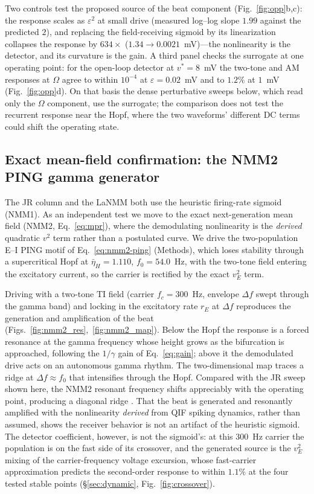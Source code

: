 \documentclass[11pt,a4paper]{article}
\begin{document}
Two controls test the proposed source of the beat component (Fig.~\ref{fig:opp}b,c): the response scales as
$\varepsilon^2$ at small drive (measured log--log slope $1.99$ against the
predicted $2$), and replacing the field-receiving sigmoid by its linearization
collapses the response by $634\times$ ($1.34\!\to\!0.0021$~mV)---the nonlinearity is
the detector, and its curvature is the gain. A third panel checks the surrogate at one operating point: for the open-loop detector
at $v^*=8$~mV the two-tone and AM responses at $\Omega$ agree to within $10^{-4}$ at
$\varepsilon=0.02$~mV and to $1.2\%$ at $1$~mV (Fig.~\ref{fig:opp}d). On that basis the
dense perturbative sweeps below, which read only the $\Omega$ component, use the surrogate;
the comparison does not test the recurrent response near the Hopf, where the two
waveforms' different DC terms could shift the operating state.

\subsection{Exact mean-field confirmation: the NMM2 PING gamma generator}\label{sec:nmm2-results}
The JR column and the LaNMM both use the heuristic firing-rate sigmoid (NMM1). As an
independent test we move to the exact next-generation mean field (NMM2,
Eq.~\eqref{eq:mpr}), where the demodulating nonlinearity is the \emph{derived}
quadratic $v^2$ term rather than a postulated curve. We drive the two-population E--I PING motif of
Eq.~\eqref{eq:nmm2-ping} (Methods), which loses stability through a supercritical
Hopf at $\bar\eta_H=1.110$, $f_0=54.0$~Hz, with the two-tone field entering the
excitatory current,
so the carrier is rectified by the exact $v_E^2$ term.

Driving with a two-tone TI field (carrier $f_c=300$~Hz, envelope $\Delta f$ swept through
the gamma band) and locking in the excitatory rate $r_E$ at $\Delta f$ reproduces the
generation and amplification of the beat (Figs.~\ref{fig:nmm2_res},~\ref{fig:nmm2_map}). Below the Hopf the
response is a forced resonance at the gamma frequency whose height grows as the
bifurcation is approached, following the $1/\gamma$ gain of Eq.~\eqref{eq:gain}; above it the
demodulated drive acts on an autonomous gamma rhythm. The two-dimensional map traces a
ridge at $\Delta f\!\approx\!f_0$ that intensifies through the Hopf. Compared with the
JR sweep shown here, the NMM2 resonant frequency shifts appreciably with the
operating point, producing a diagonal ridge \cite{clusella2023}. That the beat is generated and resonantly amplified with the nonlinearity
\emph{derived} from QIF spiking dynamics, rather than assumed, shows the receiver behavior
is not an artifact of the heuristic sigmoid. The detector coefficient, however, is not the
sigmoid's: at this $300$~Hz carrier the population is on the fast side of its crossover,
and the generated source is the $v_E^2$ mixing of the carrier-frequency voltage excursion,
whose fast-carrier approximation predicts the second-order response to within
$1.1\%$ at the four tested stable points (\S\ref{sec:dynamic}, Fig.~\ref{fig:crossover}).
\end{document}
